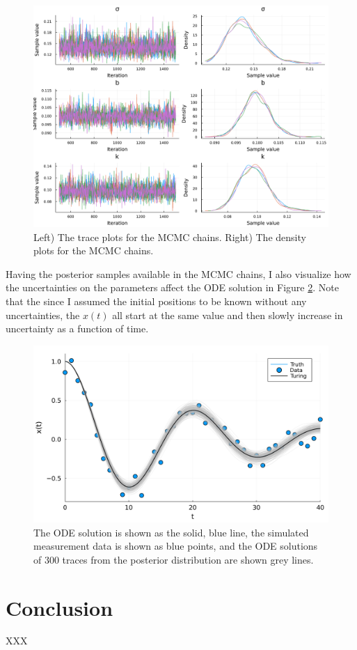 \documentclass[10pt,a4paper]{article}
\begin{document}
\begin{figure}[H]
    \includegraphics[width=\linewidth]{turing_chains.pdf}
    \caption{Left) The trace plots for the MCMC chains. Right) The density plots for the MCMC chains.}
    \label{fig:MCMC_chains}
\end{figure}

Having the posterior samples available in the MCMC chains, I also visualize how the
uncertainties on the parameters affect the ODE solution in Figure \ref{fig:MCMC}.
Note that the since I assumed the initial positions to be known without any
uncertainties, the $x(t)$ all start at the same value and then slowly increase in uncertainty
as a function of time.

\begin{figure}[H]
    \includegraphics[width=\linewidth]{turing.pdf}
    \caption{The ODE solution is shown as the solid, blue line,
        the simulated measurement data is shown as blue points,
        and the ODE solutions of 300 traces from the posterior distribution are shown grey lines.}
    \label{fig:MCMC}
\end{figure}


\section*{Conclusion}
XXX
\end{document}
